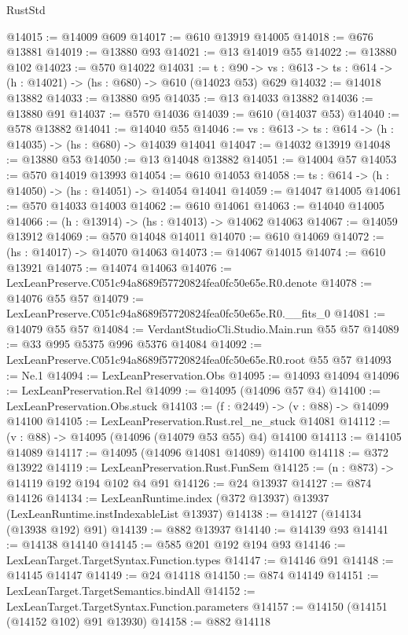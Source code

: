 \begin{lexlean}{RustStd}
\begin{coremodule}
@14015 := @14009 @609
@14017 := @610 @13919 @14005
@14018 := @676 @13881
@14019 := @13880 @93
@14021 := @13 @14019 @55
@14022 := @13880 @102
@14023 := @570 @14022
@14031 := {t : @90} ->
  {vs : @613} -> {ts : @614} -> (h : @14021) -> (hs : @680) -> @610 (@14023 @53) @629
@14032 := @14018 @13882
@14033 := @13880 @95
@14035 := @13 @14033 @13882
@14036 := @13880 @91
@14037 := @570 @14036
@14039 := @610 (@14037 @53)
@14040 := @578 @13882
@14041 := @14040 @55
@14046 := {vs : @613} -> {ts : @614} -> (h : @14035) -> (hs : @680) -> @14039 @14041
@14047 := @14032 @13919
@14048 := @13880 @53
@14050 := @13 @14048 @13882
@14051 := @14004 @57
@14053 := @570 @14019 @13993
@14054 := @610 @14053
@14058 := {ts : @614} -> (h : @14050) -> (hs : @14051) -> @14054 @14041
@14059 := @14047 @14005
@14061 := @570 @14033 @14003
@14062 := @610 @14061
@14063 := @14040 @14005
@14066 := (h : @13914) -> (hs : @14013) -> @14062 @14063
@14067 := @14059 @13912
@14069 := @570 @14048 @14011
@14070 := @610 @14069
@14072 := (hs : @14017) -> @14070 @14063
@14073 := @14067 @14015
@14074 := @610 @13921
@14075 := @14074 @14063
@14076 := LexLeanPreserve.C051c94a8689f57720824fea0fc50e65e.R0.denote
@14078 := @14076 @55 @57
@14079 := LexLeanPreserve.C051c94a8689f57720824fea0fc50e65e.R0.__fits_0
@14081 := @14079 @55 @57
@14084 := VerdantStudioCli.Studio.Main.run @55 @57
@14089 := @33 @995 @5375 @996 @5376 @14084
@14092 := LexLeanPreserve.C051c94a8689f57720824fea0fc50e65e.R0.root @55 @57
@14093 := Ne.{1}
@14094 := LexLeanPreservation.Obs
@14095 := @14093 @14094
@14096 := LexLeanPreservation.Rel
@14099 := @14095 (@14096 @57 @4)
@14100 := LexLeanPreservation.Obs.stuck
@14103 := (f : @2449) -> (v : @88) -> @14099 @14100
@14105 := LexLeanPreservation.Rust.rel_ne_stuck @14081
@14112 := (v : @88) -> @14095 (@14096 (@14079 @53 @55) @4) @14100
@14113 := @14105 @14089
@14117 := @14095 (@14096 @14081 @14089) @14100
@14118 := @372 @13922
@14119 := LexLeanPreservation.Rust.FunSem
@14125 := (n : @873) -> @14119 @192 @194 @102 @4 @91
@14126 := @24 @13937
@14127 := @874 @14126
@14134 := LexLeanRuntime.index (@372 @13937) @13937 (LexLeanRuntime.instIndexableList @13937)
@14138 := @14127 (@14134 (@13938 @192) @91)
@14139 := @882 @13937
@14140 := @14139 @93
@14141 := @14138 @14140
@14145 := @585 @201 @192 @194 @93
@14146 := LexLeanTarget.TargetSyntax.Function.types
@14147 := @14146 @91
@14148 := @14145 @14147
@14149 := @24 @14118
@14150 := @874 @14149
@14151 := LexLeanTarget.TargetSemantics.bindAll
@14152 := LexLeanTarget.TargetSyntax.Function.parameters
@14157 := @14150 (@14151 (@14152 @102) @91 @13930)
@14158 := @882 @14118

\end{coremodule}
\end{lexlean}

